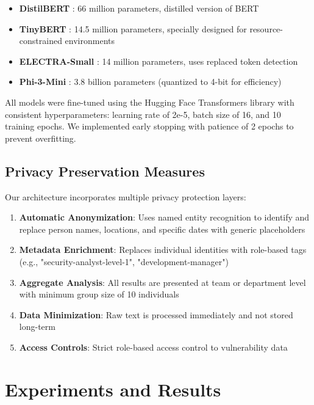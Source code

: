 \documentclass[11pt,a4paper]{article}
\begin{document}
\begin{itemize}
    \item \textbf{DistilBERT} \cite{sanh2019distilbert}: 66 million parameters, distilled version of BERT
    \item \textbf{TinyBERT} \cite{jiao2020}: 14.5 million parameters, specially designed for resource-constrained environments
    \item \textbf{ELECTRA-Small} \cite{clark2020}: 14 million parameters, uses replaced token detection
    \item \textbf{Phi-3-Mini} \cite{abdin2024}: 3.8 billion parameters (quantized to 4-bit for efficiency)
\end{itemize}

All models were fine-tuned using the Hugging Face Transformers library with consistent hyperparameters: learning rate of 2e-5, batch size of 16, and 10 training epochs. We implemented early stopping with patience of 2 epochs to prevent overfitting.

\subsection{Privacy Preservation Measures}
Our architecture incorporates multiple privacy protection layers:

\begin{enumerate}
    \item \textbf{Automatic Anonymization}: Uses named entity recognition to identify and replace person names, locations, and specific dates with generic placeholders
    \item \textbf{Metadata Enrichment}: Replaces individual identities with role-based tags (e.g., "security-analyst-level-1", "development-manager")
    \item \textbf{Aggregate Analysis}: All results are presented at team or department level with minimum group size of 10 individuals
    \item \textbf{Data Minimization}: Raw text is processed immediately and not stored long-term
    \item \textbf{Access Controls}: Strict role-based access control to vulnerability data
\end{enumerate}

\section{Experiments and Results}
\end{document}
